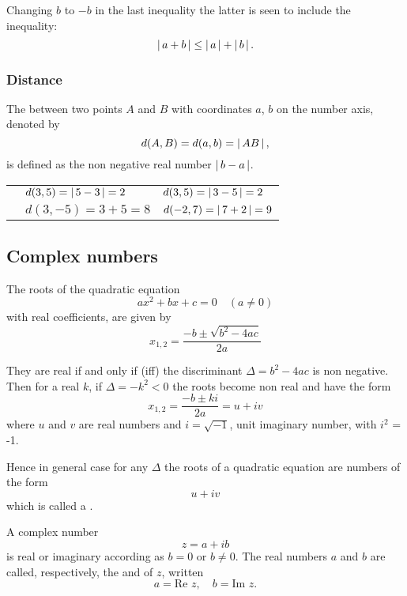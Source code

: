 \documentclass[11pt]{amsbook}
\begin{document}
Changing $b$ to $-b$ in the last inequality 
the latter is seen to include the inequality:
\[
	\left \lvert \, a + b \, \right \rvert \leq \left \lvert \, a \, \right \rvert + \left \lvert \, b \, \right \rvert.
\]




\subsubsection{Distance}
\label{subsubsec:Distance}

The  between two points $A$ and $B$ with coordinates $a$, $b$ on the number axis, denoted by
\[
	d(A, B)= d(a, b) = \left \lvert \, AB \, \right \rvert,
\]
is defined as the non negative real number $\left \lvert \, b - a \, \right \rvert$.


\begin{exmp} 
	\begin{tabular}{lll}
		& $d(3, 5) = \left \lvert \, 5 - 3 \, \right \rvert = 2$
		& $d(3, 5) = \left \lvert \, 3 - 5 \, \right \rvert = 2$ \\
		& $d(3, -5) = 3 + 5 = 8$ \quad \quad
		& $d(-2, 7) = \left \lvert \, 7 + 2 \, \right \rvert = 9$
	\end{tabular}
\end{exmp}




\subsection{Complex numbers}
\label{subsec:ComplexNumbers}

The roots of the quadratic equation 
\[
	a x^{2} + bx + c = 0 \quad (a \ne 0)
\]
with real coefficients, are given by
\[
	x_{1,2} = \frac{-b \pm \sqrt{b^{2} - 4ac}}{2a}
\]

They are real if and only if  (iff) the discriminant
$\Delta = b^{2} - 4ac$ is non negative. 
Then for a real $k$, if $\Delta = -k^{2} < 0$ the roots become non real and have the form
\[
	x_{1,2} = \frac{-b \pm ki}{2a} = u + iv
\]
where $u$ and $v$ are real numbers and 
$i=\sqrt{-1}$, unit imaginary number, with $i^{2}$ = -1.

Hence in general case for any $\Delta$ the roots of a quadratic equation are numbers of the form
\[
	u + iv
\]
which is called a .

A complex number
\[
	z = a + i b
\]
is real or imaginary according as $b = 0$ or $b \ne 0$. 
The real numbers $a$ and $b$ are called, respectively, the  and 
 of $z$, written
\[
	a = \text{Re } z, \quad b = \text{Im } z.
\]
\end{document}
